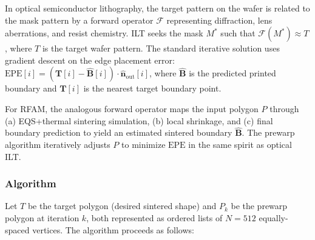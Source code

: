 \documentclass[5p,times]{elsarticle}
\newcommand{\EPE}{\mathrm{EPE}}
\newcommand{\vect}[1]{\boldsymbol{#1}}
\newcommand{\nhat}{\hat{\vect{n}}}
\begin{document}
In optical semiconductor lithography, the target pattern on the wafer
is related to the mask pattern by a forward operator $\mathcal{F}$
representing diffraction, lens aberrations, and resist chemistry.  ILT
seeks the mask $M^*$ such that $\mathcal{F}(M^*) \approx T$, where
$T$ is the target wafer pattern.  The standard iterative solution
uses gradient descent on the edge placement error:
$\EPE[i] = (\vect{T}[i] - \hat{\vect{B}}[i]) \cdot \nhat_{\mathrm{out}}[i]$,
where $\hat{\vect{B}}$ is the predicted printed boundary and
$\vect{T}[i]$ is the nearest target boundary point.

For RFAM, the analogous forward operator maps the input polygon $P$
through (a) EQS+thermal sintering simulation, (b) local shrinkage, and
(c) final boundary prediction to yield an estimated sintered boundary
$\hat{\vect{B}}$.  The prewarp algorithm iteratively adjusts $P$ to
minimize $\EPE$ in the same spirit as optical ILT.

\subsubsection{Algorithm}

Let $T$ be the target polygon (desired sintered shape) and $P_k$ be
the prewarp polygon at iteration $k$, both represented as ordered
lists of $N = 512$ equally-spaced vertices.  The algorithm proceeds
as follows:
\end{document}
